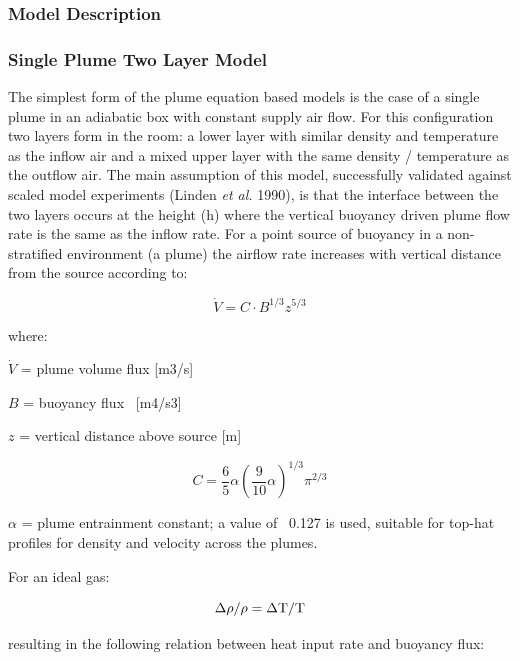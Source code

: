 {\subsubsection{Model Description}\label{model-description-002}

\subsubsection{Single Plume Two Layer Model}\label{single-plume-two-layer-model}

The simplest form of the plume equation based models is the case of a single plume in an adiabatic box with constant supply air flow. For this configuration two layers form in the room: a lower layer with similar density and temperature as the inflow air and a mixed upper layer with the same density / temperature as the outflow air. The main assumption of this model, successfully validated against scaled model experiments (Linden \emph{et al.} 1990), is that the interface between the two layers occurs at the height (h) where the vertical buoyancy driven plume flow rate is the same as the inflow rate. For a point source of buoyancy in a non-stratified environment (a plume) the airflow rate increases with vertical distance from the source according to:

\begin{equation}
\dot V = C\cdot {B^{1/3}}{z^{5/3}}
\end{equation}

where:

\(\dot V\) = plume volume flux {[}m3/s{]}

\(B\) = buoyancy flux~ {[}m4/s3{]}

\(z\) = vertical distance above source {[}m{]}

\begin{equation}
C = \frac{6}{5}\alpha {(\frac{9}{{10}}\alpha )^{1/3}}{\pi ^{2/3}}
\end{equation}

\(\alpha\) = plume entrainment constant; a value of~ 0.127 is used, suitable for top-hat profiles for density and velocity across the plumes.

For an ideal gas:

\begin{equation}
\Delta \rho /\rho  = \Delta {\rm T}/{\rm T}
\end{equation}

resulting in the following relation between heat input rate and buoyancy flux:

}
